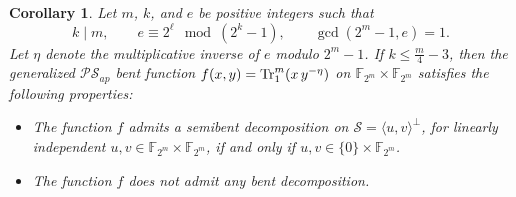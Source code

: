 \documentclass[12pt]{article}
\theoremstyle{plain}
\newtheorem{corollary}[lemma]{Corollary}
\theoremstyle{definition}
\newcommand{\Tr}{{\rm Tr}}
\begin{document}
	\begin{corollary}\label{cor:x}
		Let $m$, $k$, and $e$ be positive integers such that
		\[
		k \mid m, \qquad  e \equiv 2^{\ell} \mod{(2^{k}-1)},
		\qquad 
		\gcd(2^{m}-1,e)=1.
		\]
		Let $\eta$ denote the multiplicative inverse of $e$ modulo $2^{m}-1$.
		If $k \le \tfrac{m}{4}-3$, then the generalized $\mathcal{PS}_{ap}$ bent function $f(x,y)=\Tr_1^{m}\!\left(x\,y^{-\eta}\right)$ on $\mathbb{F}_{2^{m}} \times \mathbb{F}_{2^{m}}$
		satisfies the following properties:
		\begin{itemize}
			\item[(i)] The function $f$ admits a semibent decomposition on 
			$\mathcal{S}=\langle u,v\rangle^{\perp}$, for linearly independent
			$u,v \in \mathbb{F}_{2^{m}} \times \mathbb{F}_{2^{m}}$,
			if and only if 
			$u,v \in \{0\}\times \mathbb{F}_{2^{m}}$.
			
			\item[(ii)] The function $f$ does not admit any bent decomposition.
		\end{itemize}
	\end{corollary}
\end{document}
